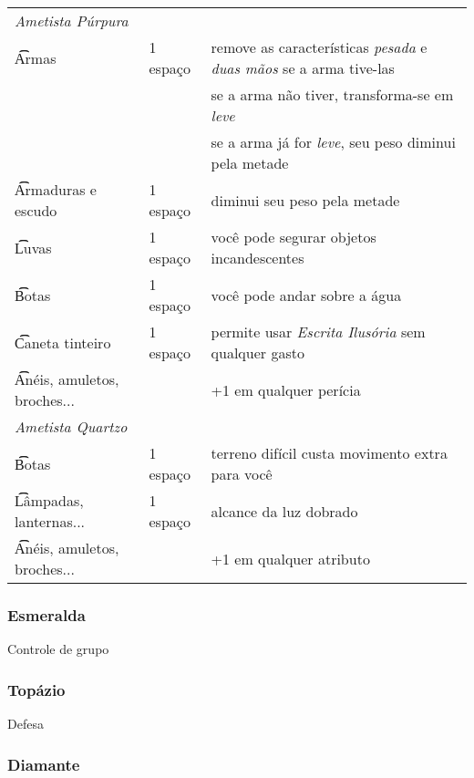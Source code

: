\begin{center}
\begin{longtable}{ m{6cm} m{2cm} m{8cm} }
    \multicolumn{2}{l}{\t\textit{Ametista Púrpura}} \\
    \t\t Armas & 1 espaço & remove as características \textit{pesada} e
    \textit{duas mãos} se a arma tive-las \\ && se a arma não tiver,
    transforma-se em \textit{leve} \\ && se a arma já for \textit{leve}, seu
    peso diminui pela metade \\ \hline
    \t\t Armaduras e escudo & 1 espaço & diminui seu peso pela metade \\ \hline
    \t\t Luvas & 1 espaço & você pode segurar objetos incandescentes \\ \hline
    \t\t Botas & 1 espaço & você pode andar sobre a água \\ \hline
    \t\t Caneta tinteiro & 1 espaço & permite usar \textit{Escrita Ilusória} sem
    qualquer gasto \\ \hline
    \t\t Anéis, amuletos, broches... && +1 em qualquer perícia \\
    \hline \hline

    \multicolumn{2}{l}{\t\textit{Ametista Quartzo}} \\
    \t\t Botas & 1 espaço & terreno difícil custa movimento extra para você \\
    \hline
    \t\t Lâmpadas, lanternas... & 1 espaço & alcance da luz dobrado \\
    \hline
    \t\t Anéis, amuletos, broches... &&  +1 em qualquer atributo \\
    \hline \hline

\end{longtable}
\end{center}

\subsubsection{Esmeralda}%

Controle de grupo

\subsubsection{Topázio}%

Defesa

\subsubsection{Diamante}%

\begin{multicols}{2}
\end{multicols}

